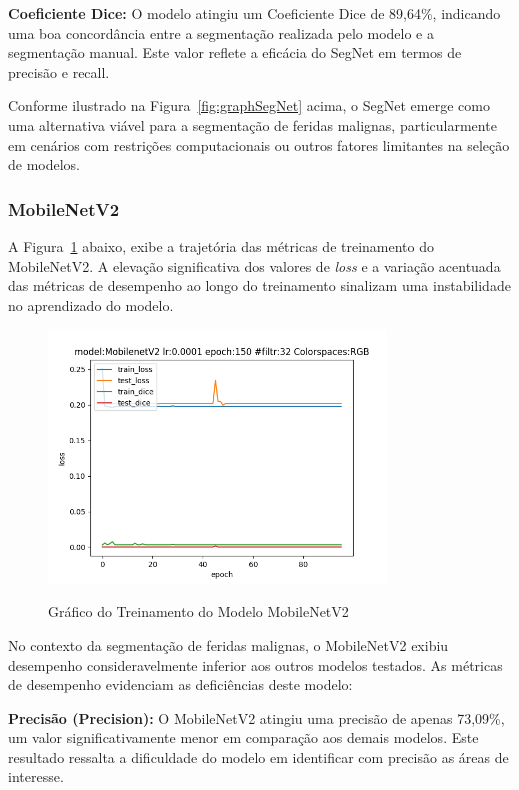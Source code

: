 \textbf{Coeficiente Dice:} O modelo atingiu um Coeficiente Dice de 89,64\%, indicando uma boa concordância entre a segmentação realizada pelo modelo e a segmentação manual. Este valor reflete a eficácia do \ac{SegNet} em termos de precisão e recall.

Conforme ilustrado na Figura~\ref{fig:graphSegNet} acima, o \ac{SegNet} emerge como uma alternativa viável para a segmentação de feridas malignas, particularmente em cenários com restrições computacionais ou outros fatores limitantes na seleção de modelos.
         
\subsubsection{MobileNetV2}
A Figura~\ref{fig:graphMobileNetV2} abaixo, exibe a trajetória das métricas de treinamento do \ac{MobileNetV2}. A elevação significativa dos valores de \textit{loss} e a variação acentuada das métricas de desempenho ao longo do treinamento sinalizam uma instabilidade no aprendizado do modelo.

\begin{figure}[htbp]
    \centering
    \caption{Gráfico do Treinamento do Modelo \acf{MobileNetV2}}
    \includegraphics[width=0.8\textwidth]{img/mobilenetv2prunedmodelfile.png}
    \label{fig:graphMobileNetV2}
\end{figure}

No contexto da segmentação de feridas malignas, o \ac{MobileNetV2} exibiu desempenho consideravelmente inferior aos outros modelos testados. As métricas de desempenho evidenciam as deficiências deste modelo:

\textbf{Precisão (Precision):} O MobileNetV2 atingiu uma precisão de apenas 73,09\%, um valor significativamente menor em comparação aos demais modelos. Este resultado ressalta a dificuldade do modelo em identificar com precisão as áreas de interesse.

